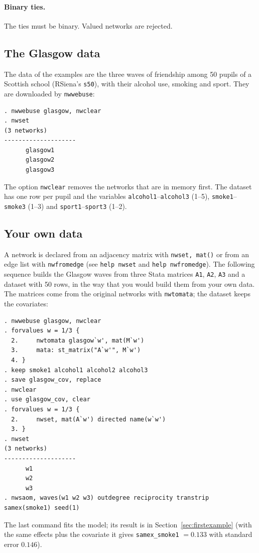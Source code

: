 \paragraph{Binary ties.} The ties must be binary. Valued networks are rejected.

\subsection*{The Glasgow data}

The data of the examples are the three waves of friendship among 50 pupils of a Scottish school (RSiena's \texttt{s50}), with their alcohol use, smoking and sport. They are downloaded by \texttt{nwwebuse}:
\begin{lstlisting}
. nwwebuse glasgow, nwclear
. nwset
(3 networks)
--------------------
      glasgow1
      glasgow2
      glasgow3
\end{lstlisting}
The option \texttt{nwclear} removes the networks that are in memory first. The dataset has one row per pupil and the variables \texttt{alcohol1}--\texttt{alcohol3} (1--5), \texttt{smoke1}--\texttt{smoke3} (1--3) and \texttt{sport1}--\texttt{sport3} (1--2).

\subsection*{Your own data}

A network is declared from an adjacency matrix with \texttt{nwset, mat()} or from an edge list with \texttt{nwfromedge} (see \texttt{help nwset} and \texttt{help nwfromedge}). The following sequence builds the Glasgow waves from three Stata matrices \texttt{A1}, \texttt{A2}, \texttt{A3} and a dataset with 50 rows, in the way that you would build them from your own data. The matrices come from the original networks with \texttt{nwtomata}; the dataset keeps the covariates:
\begin{lstlisting}
. nwwebuse glasgow, nwclear
. forvalues w = 1/3 {
  2.     nwtomata glasgow`w', mat(M`w')
  3.     mata: st_matrix("A`w'", M`w')
  4. }
. keep smoke1 alcohol1 alcohol2 alcohol3
. save glasgow_cov, replace
. nwclear
. use glasgow_cov, clear
. forvalues w = 1/3 {
  2.     nwset, mat(A`w') directed name(w`w')
  3. }
. nwset
(3 networks)
--------------------
      w1
      w2
      w3
. nwsaom, waves(w1 w2 w3) outdegree reciprocity transtrip samex(smoke1) seed(1)
\end{lstlisting}
The last command fits the model; its result is in Section~\ref{sec:firstexample} (with the same effects plus the covariate it gives \texttt{samex\_smoke1} $=0.133$ with standard error $0.146$).

